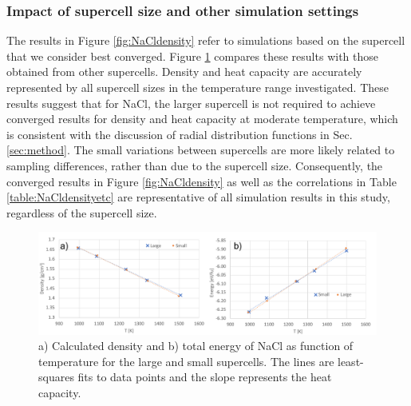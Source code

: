 \documentclass[titlepage=firstiscover,11pt,fleqn,headheight=14pt,footheight=40.8pt]{scrreprt}
\begin{document}

\subsubsection{Impact of supercell size and other simulation settings}
The results in Figure \ref{fig:NaCldensity} refer to simulations based on the supercell that we consider best converged. Figure \ref{fig:NaClsize} compares these results with those obtained from other supercells. Density and heat capacity are accurately represented by all supercell sizes in the temperature range investigated.
 These results suggest that for NaCl, the larger supercell is not required to achieve converged results for density and heat capacity at moderate temperature, which is consistent with the discussion of radial distribution functions in Sec. \ref{sec:method}. The small variations between supercells are more likely related to sampling differences, rather than due to the supercell size. Consequently, the converged results in Figure \ref{fig:NaCldensity} as well as the correlations in Table \ref{table:NaCldensityetc} are representative of all simulation results in this study, regardless of the supercell size. %

\begin{figure}[htb]
\centering
\includegraphics[width=1.00\textwidth]{FIG3b.pdf}
\caption{a) Calculated density and b) total energy of NaCl as function of temperature for the large and small supercells. The lines are least-squares fits to data points and the slope represents the heat capacity.} 
\label{fig:NaClsize}
\end{figure}
\end{document}

